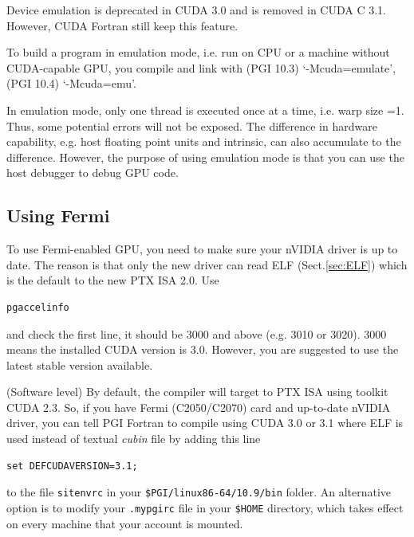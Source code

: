 \begin{framed}
  Device emulation is deprecated in CUDA 3.0 and is removed in CUDA C
  3.1. However, CUDA Fortran still keep this feature.
\end{framed}

To build a program in emulation mode, i.e. run on CPU or a machine
without CUDA-capable GPU, you compile and link with
(PGI 10.3) `-Mcuda=emulate', (PGI 10.4) `-Mcuda=emu'. 

In emulation mode, only one thread is executed once at a time,
i.e. warp size =1. Thus, some potential errors will not be
exposed. The difference in hardware capability, e.g. host floating
point units and intrinsic, can also accumulate to the
difference. However, the purpose of using emulation mode is that you
can use the host debugger to debug GPU code.

\subsection{Using Fermi}
\label{sec:using-fermi}

To use Fermi-enabled GPU, you need to make sure your nVIDIA driver is
up to date. The reason is that only the new driver can read ELF (Sect.\ref{sec:ELF}) which
is the default to the new PTX ISA 2.0. Use
\begin{verbatim}
pgaccelinfo
\end{verbatim}
and check the first line, it should be 3000 and above (e.g. 3010 or
3020). 3000 means the installed CUDA version is 3.0. However, you are
suggested to use the latest stable version available. 

(Software level) By default, the compiler will target to PTX ISA using toolkit
CUDA 2.3. So, if you have Fermi (C2050/C2070) card and up-to-date nVIDIA driver,
you can tell PGI Fortran to compile using CUDA 3.0 or 3.1 where ELF is used
instead of textual {\it cubin} file by adding this line
\begin{verbatim}
set DEFCUDAVERSION=3.1;
\end{verbatim}
to the file \verb!sitenvrc! in your \verb!$PGI/linux86-64/10.9/bin!
folder. An alternative option is to modify your \verb!.mypgirc! file
in your \verb!$HOME! directory, which takes effect on every machine
that your account is mounted. 


